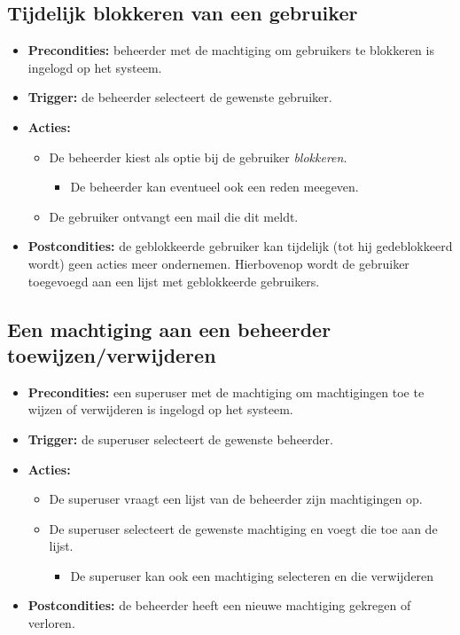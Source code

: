 \documentclass[]{article}
\begin{document}
\subsection{Tijdelijk blokkeren van een gebruiker}
\begin{itemize}
\item \textbf{Precondities:} beheerder met de machtiging om gebruikers te blokkeren is ingelogd op het systeem.
\item \textbf{Trigger:} de beheerder selecteert de gewenste gebruiker.

\item \textbf{Acties:} 
\begin{itemize}
	\item	De beheerder kiest als optie bij de gebruiker \emph{blokkeren}. 
		\begin{itemize}
			\item De beheerder kan eventueel ook een reden meegeven.
		\end{itemize}
	\item	De gebruiker ontvangt een mail die dit meldt.
\end{itemize}
\item \textbf{Postcondities:} de geblokkeerde gebruiker kan tijdelijk (tot hij gedeblokkeerd wordt) geen acties meer ondernemen. Hierbovenop wordt de gebruiker toegevoegd aan een lijst met geblokkeerde gebruikers.
\end{itemize}

\subsection{Een machtiging aan een beheerder toewijzen/verwijderen}
\begin{itemize}
\item \textbf{Precondities:} een superuser met de machtiging om machtigingen toe te wijzen of verwijderen is ingelogd op het systeem.
\item \textbf{Trigger:} de superuser selecteert de gewenste beheerder.

\item \textbf{Acties:} 
\begin{itemize}
	\item	De superuser vraagt een lijst van de beheerder zijn machtigingen op.
	\item	De superuser selecteert de gewenste machtiging en voegt die toe aan de lijst.
		\begin{itemize}
			\item De superuser kan ook een machtiging selecteren en die verwijderen
		\end{itemize}
\end{itemize}
\item \textbf{Postcondities:} de beheerder heeft een nieuwe machtiging gekregen of verloren.
\end{itemize}
\end{document}
